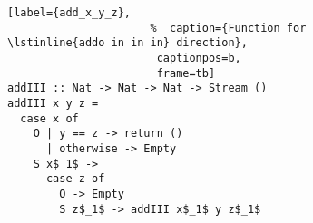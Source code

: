 \begin{figure}[!t]
  \centering
  \begin{minipage}{\columnwidth}
    \begin{lstlisting}[label={add_x_y_z},
                      %  caption={Function for \lstinline{addo in in in} direction},
                       captionpos=b,
                       frame=tb]
addIII :: Nat -> Nat -> Nat -> Stream ()
addIII x y z =
  case x of
    O | y == z -> return ()
      | otherwise -> Empty
    S x$_1$ ->
      case z of
        O -> Empty
        S z$_1$ -> addIII x$_1$ y z$_1$
    \end{lstlisting}
  \end{minipage}
\end{figure}